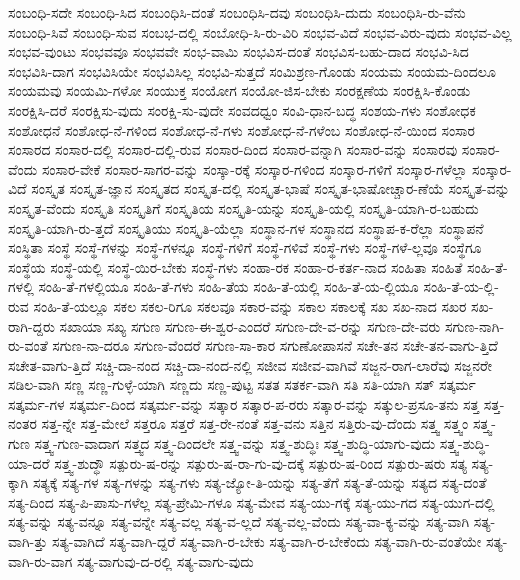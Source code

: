 {ಸಂಬಂಧಿ-ಸದೇ
ಸಂಬಂಧಿ-ಸಿದ
ಸಂಬಂಧಿಸಿ-ದಂತೆ
ಸಂಬಂಧಿಸಿ-ದವು
ಸಂಬಂಧಿಸಿ-ದುದು
ಸಂಬಂಧಿಸಿ-ರು-ವೆನು
ಸಂಬಂಧಿ-ಸಿವೆ
ಸಂಬಂಧಿ-ಸುವ
ಸಂಬಭ-ದಲ್ಲಿ
ಸಂಬೋಧಿ-ಸಿ-ರು-ವಿರಿ
ಸಂಭವ-ವಿದೆ
ಸಂಭವ-ವಿರು-ವುದು
ಸಂಭವ-ವಿಲ್ಲ
ಸಂಭವ-ವುಂಟು
ಸಂಭವವೂ
ಸಂಭವವೇ
ಸಂಭ-ವಾಮಿ
ಸಂಭವಿಸ-ದಂತೆ
ಸಂಭವಿಸ-ಬಹು-ದಾದ
ಸಂಭವಿ-ಸಿದ
ಸಂಭವಿಸಿ-ದಾಗ
ಸಂಭವಿಸಿಯೇ
ಸಂಭವಿಸಿಲ್ಲ
ಸಂಭವಿ-ಸುತ್ತದೆ
ಸಂಮಿಶ್ರಣ-ಗೊಂಡು
ಸಂಯಮ
ಸಂಯಮ-ದಿಂದಲೂ
ಸಂಯಮವು
ಸಂಯಮಿ-ಗಳೋ
ಸಂಯುಕ್ತ
ಸಂಯೋಗ
ಸಂಯೋ-ಜಿಸ-ಬೇಕು
ಸಂರಕ್ಷಣೆಯ
ಸಂರಕ್ಷಿಸಿ-ಕೊಂಡು
ಸಂರಕ್ಷಿಸಿ-ದರೆ
ಸಂರಕ್ಷಿಸು-ವುದು
ಸಂರಕ್ಷಿ-ಸು-ವುದೇ
ಸಂವದಧ್ವಂ
ಸಂವಿ-ಧಾನ-ಬದ್ಧ
ಸಂಶಯ-ಗಳು
ಸಂಶೋಧಕ
ಸಂಶೋಧನೆ
ಸಂಶೋಧ-ನೆ-ಗಳಿಂದ
ಸಂಶೋಧ-ನೆ-ಗಳು
ಸಂಶೋಧ-ನೆ-ಗಳೆಂಬ
ಸಂಶೋಧ-ನೆ-ಯಿಂದ
ಸಂಸಾರ
ಸಂಸಾರದ
ಸಂಸಾರ-ದಲ್ಲಿ
ಸಂಸಾರ-ದಲ್ಲಿ-ರುವ
ಸಂಸಾರ-ದಿಂದ
ಸಂಸಾರ-ವನ್ನಾಗಿ
ಸಂಸಾರ-ವನ್ನು
ಸಂಸಾರವು
ಸಂಸಾರ-ವೆಂದು
ಸಂಸಾರ-ವೇಕೆ
ಸಂಸಾರ-ಸಾಗರ-ವನ್ನು
ಸಂಸ್ಕಾ-ರಕ್ಕೆ
ಸಂಸ್ಕಾರ-ಗಳಿಂದ
ಸಂಸ್ಕಾರ-ಗಳಿಗೆ
ಸಂಸ್ಕಾರ-ಗಳೆಲ್ಲಾ
ಸಂಸ್ಕಾರ-ವಿದೆ
ಸಂಸ್ಕೃತ
ಸಂಸ್ಕೃತ-ಜ್ಞಾನ
ಸಂಸ್ಕೃತದ
ಸಂಸ್ಕೃತ-ದಲ್ಲಿ
ಸಂಸ್ಕೃತ-ಭಾಷೆ
ಸಂಸ್ಕೃತ-ಭಾಷೋಚ್ಚಾರ-ಣೆಯೆ
ಸಂಸ್ಕೃತ-ವನ್ನು
ಸಂಸ್ಕೃತ-ವೆಂದು
ಸಂಸ್ಕೃತಿ
ಸಂಸ್ಕೃತಿಗೆ
ಸಂಸ್ಕೃತಿಯ
ಸಂಸ್ಕೃತಿ-ಯನ್ನು
ಸಂಸ್ಕೃತಿ-ಯಲ್ಲಿ
ಸಂಸ್ಕೃತಿ-ಯಾಗಿ-ರ-ಬಹುದು
ಸಂಸ್ಕೃತಿ-ಯಾಗಿ-ರು-ತ್ತದೆ
ಸಂಸ್ಕೃತಿಯು
ಸಂಸ್ಕೃತಿ-ಯೆಲ್ಲಾ
ಸಂಸ್ಥಾನ-ಗಳ
ಸಂಸ್ಥಾನದ
ಸಂಸ್ಥಾಪ-ಕ-ರೆಲ್ಲಾ
ಸಂಸ್ಥಾಪನೆ
ಸಂಸ್ಥಿತಾ
ಸಂಸ್ಥೆ
ಸಂಸ್ಥೆ-ಗಳನ್ನು
ಸಂಸ್ಥೆ-ಗಳನ್ನೂ
ಸಂಸ್ಥೆ-ಗಳಿಗೆ
ಸಂಸ್ಥೆ-ಗಳಿವೆ
ಸಂಸ್ಥೆ-ಗಳು
ಸಂಸ್ಥೆ-ಗಳೆ-ಲ್ಲವೂ
ಸಂಸ್ಥೆಗೂ
ಸಂಸ್ಥೆಯ
ಸಂಸ್ಥೆ-ಯಲ್ಲಿ
ಸಂಸ್ಥೆ-ಯಿರ-ಬೇಕು
ಸಂಸ್ಧೆ-ಗಳು
ಸಂಹಾ-ರಕ
ಸಂಹಾ-ರ-ಕರ್ತ-ನಾದ
ಸಂಹಿತಾ
ಸಂಹಿತೆ
ಸಂಹಿ-ತೆ-ಗಳಲ್ಲಿ
ಸಂಹಿ-ತೆ-ಗಳಲ್ಲಿಯೂ
ಸಂಹಿ-ತೆ-ಗಳು
ಸಂಹಿ-ತೆಯ
ಸಂಹಿ-ತೆ-ಯಲ್ಲಿ
ಸಂಹಿ-ತೆ-ಯ-ಲ್ಲಿಯೂ
ಸಂಹಿ-ತೆ-ಯ-ಲ್ಲಿ-ರುವ
ಸಂಹಿ-ತೆ-ಯಲ್ಲೂ
ಸಕಲ
ಸಕಲ-ರಿಗೂ
ಸಕಲವೂ
ಸಕಾರ-ವನ್ನು
ಸಕಾಲ
ಸಕಾಲಕ್ಕೆ
ಸಖ
ಸಖ-ನಾದ
ಸಖರ
ಸಖ-ರಾಗಿ-ದ್ದರು
ಸಖಾಯಾ
ಸಖ್ಯ
ಸಗುಣ
ಸಗುಣ-ಈ-ಶ್ವರ-ಎಂದರೆ
ಸಗುಣ-ದೇ-ವ-ರನ್ನು
ಸಗುಣ-ದೇ-ವರು
ಸಗುಣ-ನಾಗಿ-ರು-ವಂತೆ
ಸಗುಣ-ನಾ-ದರೂ
ಸಗುಣ-ವೆಂದರೆ
ಸಗುಣ-ಸಾ-ಕಾರ
ಸಗುಣೋಪಾಸನೆ
ಸಚೇ-ತನ
ಸಚೇ-ತನ-ವಾಗು-ತ್ತಿದೆ
ಸಚೇತ-ವಾಗು-ತ್ತಿದೆ
ಸಚ್ಚಿ-ದಾ-ನಂದ
ಸಚ್ಚಿ-ದಾ-ನಂದ-ನಲ್ಲಿ
ಸಜೀವ
ಸಜೀವ-ವಾಗಿವೆ
ಸಜ್ಜನ-ರಾಗ-ಲಾರೆವು
ಸಜ್ಜನರೇ
ಸಡಿಲ-ವಾಗಿ
ಸಣ್ಣ
ಸಣ್ಣ-ಗುಳ್ಳೆ-ಯಾಗಿ
ಸಣ್ಣದು
ಸಣ್ಣ-ಪುಟ್ಟ
ಸತತ
ಸತರ್ಕ-ವಾಗಿ
ಸತಿ
ಸತಿ-ಯಾಗಿ
ಸತ್
ಸತ್ಕರ್ಮ
ಸತ್ಕರ್ಮ-ಗಳ
ಸತ್ಕರ್ಮ-ದಿಂದ
ಸತ್ಕರ್ಮ-ವನ್ನು
ಸತ್ಕಾರ
ಸತ್ಕಾರ-ಪ-ರರು
ಸತ್ಕಾರ-ವನ್ನು
ಸತ್ಕುಲ-ಪ್ರಸೂ-ತನು
ಸತ್ತ
ಸತ್ತ-ನಂತರ
ಸತ್ತ-ನ್ನೇ
ಸತ್ತ-ಮೇಲೆ
ಸತ್ತರೂ
ಸತ್ತರೆ
ಸತ್ತ-ರೇ-ನಂತೆ
ಸತ್ತ-ವನು
ಸತ್ತಿನ
ಸತ್ತಿರು-ವು-ದೆಂದು
ಸತ್ತ್ವ
ಸತ್ತ್ವಂ
ಸತ್ತ್ವ-ಗುಣ
ಸತ್ತ್ವ-ಗುಣ-ವಾದಾಗ
ಸತ್ತ್ವದ
ಸತ್ತ್ವ-ದಿಂದಲೇ
ಸತ್ತ್ವ-ವನ್ನು
ಸತ್ತ್ವ-ಶುದ್ಧಿಃ
ಸತ್ತ್ವ-ಶುದ್ಧಿ-ಯಾಗು-ವುದು
ಸತ್ತ್ವ-ಶುದ್ಧಿ-ಯಾ-ದರೆ
ಸತ್ತ್ವ-ಶುದ್ಧೌ
ಸತ್ಪುರು-ಷ-ರನ್ನು
ಸತ್ಪುರು-ಷ-ರಾ-ಗು-ವು-ದಕ್ಕೆ
ಸತ್ಪುರು-ಷ-ರಿಂದ
ಸತ್ಪುರು-ಷರು
ಸತ್ಯ
ಸತ್ಯ-ಕ್ಕಾಗಿ
ಸತ್ಯಕ್ಕೆ
ಸತ್ಯ-ಗಳ
ಸತ್ಯ-ಗಳನ್ನು
ಸತ್ಯ-ಗಳು
ಸತ್ಯ-ಜ್ಯೋ-ತಿ-ಯನ್ನು
ಸತ್ಯ-ತೆಗೆ
ಸತ್ಯ-ತೆ-ಯನ್ನು
ಸತ್ಯದ
ಸತ್ಯ-ದಂತೆ
ಸತ್ಯ-ದಿಂದ
ಸತ್ಯ-ಪಿ-ಪಾಸು-ಗಳೆಲ್ಲ
ಸತ್ಯ-ಪ್ರೇಮಿ-ಗಳೂ
ಸತ್ಯ-ಮೇವ
ಸತ್ಯ-ಯು-ಗಕ್ಕೆ
ಸತ್ಯ-ಯು-ಗದ
ಸತ್ಯ-ಯುಗ-ದಲ್ಲಿ
ಸತ್ಯ-ವನ್ನು
ಸತ್ಯ-ವನ್ನೂ
ಸತ್ಯ-ವನ್ನೇ
ಸತ್ಯ-ವಲ್ಲ
ಸತ್ಯ-ವ-ಲ್ಲದೆ
ಸತ್ಯ-ವಲ್ಲ-ವೆಂದು
ಸತ್ಯ-ವಾ-ಕ್ಯ-ವನ್ನು
ಸತ್ಯ-ವಾಗಿ
ಸತ್ಯ-ವಾಗಿ-ತ್ತು
ಸತ್ಯ-ವಾಗಿದೆ
ಸತ್ಯ-ವಾಗಿ-ದ್ದರೆ
ಸತ್ಯ-ವಾಗಿ-ರ-ಬೇಕು
ಸತ್ಯ-ವಾಗಿ-ರ-ಬೇಕೆಂದು
ಸತ್ಯ-ವಾಗಿ-ರು-ವಂತೆಯೇ
ಸತ್ಯ-ವಾಗಿ-ರು-ವಾಗ
ಸತ್ಯ-ವಾಗುವು-ದ-ರಲ್ಲಿ
ಸತ್ಯ-ವಾಗು-ವುದು
}
